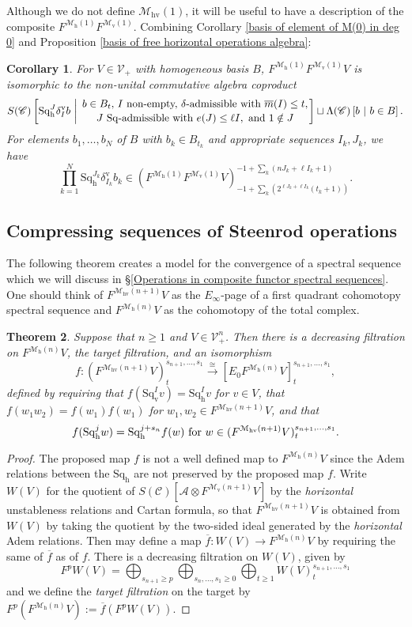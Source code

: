 \documentclass[11pt]{amsart} \renewcommand{\baselinestretch}{1.2}
\theoremstyle{plain}
\newtheorem{thm}{Theorem}[section] %
\newtheorem{cor}[thm]{Corollary}
\numberwithin{equation}{section} %
\theoremstyle{plain}
\newtheorem{thm}{Theorem}[chapter] %
\newtheorem{cor}[thm]{Corollary}
\numberwithin{equation}{chapter} %
\renewcommand{\to}{\longrightarrow}
\newcommand{\scrC}{\mathscr{C}}
\newcommand{\calA}{\mathcal{A}}
\newcommand{\calV}{\mathcal{V}}
\newcommand{\calMv}{\mathcal{M}\dver}
\newcommand{\calMh}{\mathcal{M}\dhor}
\newcommand{\calMhv}{\mathcal{M}_\mathrm{hv}}
\newcommand{\CommOperad}{{\scrC}}
\newcommand{\vect}[2]{\calV^{#1}_{#2}}
\newcommand{\minDimP}{\overline{m}}
\newcommand{\excess}{e}
\newcommand{\Sq}{\mathrm{Sq}}
\newcommand{\LieSteen}{\calA}
\newcommand{\Edown}[4]{[E_{#1}#2]^{#3}_{#4}}
\newcommand{\uver}{^\mathrm{v}}
\newcommand{\dver}{_\mathrm{v}}
\newcommand{\dhor}{_\mathrm{h}}
\newcommand{\Sqh}{\mathrm{Sq}\dhor}
\newcommand{\Sqv}{\mathrm{Sq}\dver}
\newcommand{\deltav}{\delta\uver}
\newcommand{\SubsectionOrSection}[1]{\subsection{#1}}
\begin{document}
\begin{Cohomology Operations for W and U}
Although we do not define $\calMhv(1)$, it will be useful to have a description of the composite $F^{\calMh(1)}F^{\calMv(1)}$.
Combining Corollary \ref{basis of element of M(0) in deg 0} and Proposition \ref{basis of free horizontal operations algebra}:

\begin{cor}
\label{calMhv(1) description}
For $V\in\vect{}{+}$ with homogeneous basis $B$, $F^{\calMh(1)}F^{\calMv(1)} V$ is isomorphic to the non-unital commutative algebra coproduct
\[S(\CommOperad) \left[\Sqh^J\deltav_Ib\ \middle|\ \genfrac{}{}{0pt}{}{b\in B_t\textup{, $I$ non-empty, $\delta$-admissible with }\minDimP(I)\leq t,}{\textup{$J$ $\Sq$-admissible with }\excess(J)\leq \ell I,\textup{ and }1\notin J}\right]\sqcup \Lambda(\CommOperad)\left[b\ \middle|\ b\in B\right].\]
For elements $b_1,\ldots,b_N$ of $B$ with $b_k\in B_{t_k}$ and appropriate sequences $I_k,J_k$, we have
\[\textstyle\prod_{k=1}^N \Sqh^{J_k}\deltav_{I_k}b_k\in \left(F^{\calMh(1)}F^{\calMv(1)}V\right)^{-1+\sum_k(nJ_k+\ell I_k+1)}_{-1+\sum_k(2^{\ell J_k+\ell I_k}(t_k+1))}.\]
\end{cor}



\SubsectionOrSection{Compressing sequences of Steenrod operations}
The following theorem creates a model for the convergence of a spectral sequence which we will discuss in \S\ref{Operations in composite functor spectral sequences}. One should think of $F^{\calMhv(n+1)}V$ as the $E_\infty$-page of  a first quadrant cohomotopy spectral sequence and $F^{\calMh(n)}V$ as the cohomotopy of the total complex.
\begin{thm}
\label{thm on compressing seqs of steenrod ops}
Suppose that $n\geq1$ and $V\in \vect{n}{+}$. Then there is a decreasing filtration on $F^{\calMh(n)}V$, the \emph{target filtration}, and an isomorphism
\[ f:(F^{\calMhv(n+1)}V)^{s_{n+1},\ldots,s_1}_t\overset{\cong}{\to} \Edown{0}{F^{\calMh(n)}V}{s_{n+1},\ldots,s_1}{t},\]
defined by requiring that
$f(\Sqv^Iv)=\Sqh^Iv$ for $v\in V$, that $f(w_1w_2)=f(w_1)f(w_1)$ for $w_1,w_2\in F^{\calMhv(n+1)}V$,
and that
\[f(\Sqh^jw)=\Sqh^{j+s_n}f(w)\textup{ for }w\in (F^{\calMhv(n+1)}V)^{s_{n+1},\ldots,s_1}_t.\]
\end{thm}
\begin{proof}
The proposed map $f$ is not a well defined map to $F^{\calMh(n)}V$ since the Adem relations between the $\Sqh$ are not preserved by the proposed map $f$. Write $W(V)$ for the quotient of $S(\CommOperad)[\LieSteen\otimes F^{\calMv(n+1)}V]$ by the \emph{horizontal} unstableness relations and Cartan formula, so that $F^{\calMhv(n+1)}V$ is obtained from $W(V)$ by taking the quotient by the two-sided ideal generated by the \emph{horizontal} Adem relations. Then may define a map $\overline{f}:W(V)\to F^{\calMh(n)}V$ by requiring the same of $\overline{f}$ as of $f$. There is a decreasing filtration on $W(V)$, given by 
\[F^pW(V)=\bigoplus_{s_{n+1}\geq p}\bigoplus_{s_n,\ldots,s_1\geq0}\bigoplus_{t\geq1}W(V)^{s_{n+1},\ldots,s_1}_t\]
 and we define the \emph{target filtration} on the target by $F^p(F^{\calMh(n)}V):=\overline{f}(F^pW(V))$.


\end{proof}
\end{Cohomology Operations for W and U}
\end{document}
